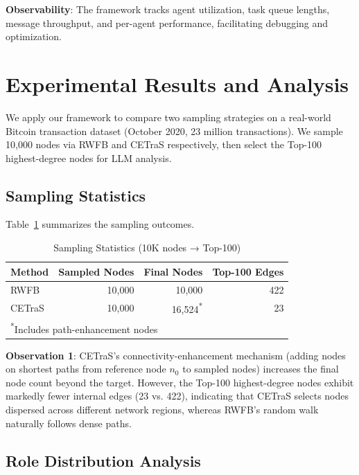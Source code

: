 \textbf{Observability}: The framework tracks agent utilization, task queue lengths, message throughput, and per-agent performance, facilitating debugging and optimization.


\section{Experimental Results and Analysis}\label{sec:results}

We apply our framework to compare two sampling strategies on a real-world Bitcoin transaction dataset (October 2020, 23 million transactions). We sample 10,000 nodes via RWFB and CETraS respectively, then select the Top-100 highest-degree nodes for LLM analysis.

\subsection{Sampling Statistics}

Table~\ref{tab:sampling-stats} summarizes the sampling outcomes.

\begin{table}[!t]
\centering
\caption{Sampling Statistics (10K nodes → Top-100)}
\label{tab:sampling-stats}
\begin{tabular}{l r r r}
\toprule
Method & Sampled Nodes & Final Nodes & Top-100 Edges \\
\midrule
RWFB & 10,000 & 10,000 & 422 \\
CETraS & 10,000 & 16,524\textsuperscript{*} & 23 \\
\bottomrule
\multicolumn{4}{l}{\textsuperscript{*}Includes path-enhancement nodes}
\end{tabular}
\end{table}

\textbf{Observation 1}: CETraS's connectivity-enhancement mechanism (adding nodes on shortest paths from reference node $n_0$ to sampled nodes) increases the final node count beyond the target. However, the Top-100 highest-degree nodes exhibit markedly fewer internal edges (23 vs. 422), indicating that CETraS selects nodes dispersed across different network regions, whereas RWFB's random walk naturally follows dense paths.

\subsection{Role Distribution Analysis}

